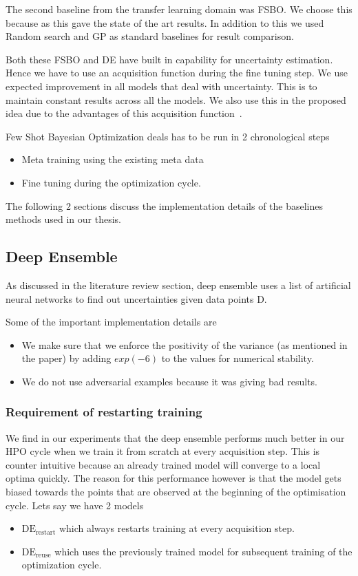 \documentclass[11pt]{report}
\begin{document}
The second baseline from the transfer learning domain was FSBO.
We choose this because as this gave the state of the art results.
In addition to this we used Random search and GP as standard baselines for result comparison.

Both these FSBO and DE have built in capability for uncertainty estimation.
Hence we have to use an acquisition function during the fine tuning step.
We use expected improvement in all models that deal with uncertainty.
This is to maintain constant results across all the models.
We also use this in the proposed idea due to the advantages of this acquisition function~\cite{Jones1998}.

Few Shot Bayesian Optimization deals has to be run in 2 chronological steps
\begin{itemize}
\item Meta training using the existing meta data
\item Fine tuning during the optimization cycle.
\end{itemize}


The following 2 sections discuss the implementation details of the baselines methods used in our thesis.

\subsection{Deep Ensemble}
As discussed in the literature review section,  deep ensemble uses a list of artificial neural networks to find out uncertainties given data points D.

Some of the important implementation details are
\begin{itemize}
\item We make sure that we enforce the positivity of the variance (as mentioned in the paper) by adding $exp(-6)$ to the values for numerical stability.
\item We do not use adversarial examples because it was giving bad results.
\end{itemize}
    
\subsubsection{Requirement of restarting training}\label{sec:restart}
We find in our experiments that the deep ensemble performs much better in our HPO cycle when we train it from scratch at every acquisition step.
This is counter intuitive because an already trained model will converge to a local optima quickly.
The reason for this performance however is that the model gets biased towards the points that are observed at the beginning of the optimisation cycle.
Lets say we have 2 models 
\begin{itemize}
\item $\textrm{DE}_{\textrm{restart}}$ which always restarts training at every acquisition step.
\item $\textrm{DE}_{\textrm{reuse}}$ which uses the previously trained model for subsequent training of the optimization cycle.
\end{itemize}
\end{document}
